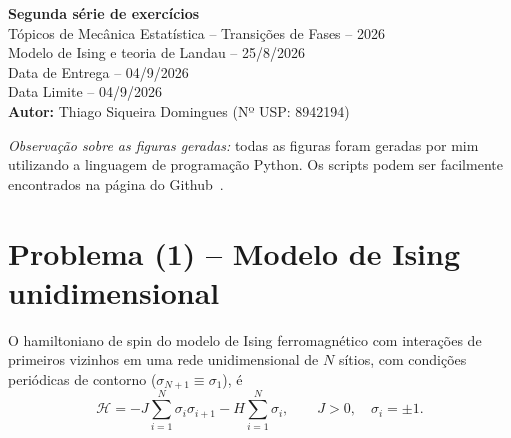 \documentclass[11pt,a4paper]{article}
\begin{document}
%
\begin{center}
    {\Large \textbf{Segunda série de exercícios}}\\[0.6cm]
    {\large Tópicos de Mecânica Estatística -- Transições de Fases -- 2026}\\[0.2cm]
    {\large Modelo de Ising e teoria de Landau -- 25/8/2026}\\[0.4cm]
    {\large Data de Entrega -- 04/9/2026}\\[0.2cm]
    {\large Data Limite -- 04/9/2026}\\[0.2cm]
    {\Large \textbf{Autor:} Thiago Siqueira Domingues (Nº USP: 8942194)}
\end{center}
%
\vspace{0.3cm}

\noindent\textit{Observação sobre as figuras geradas:} todas as figuras foram geradas por mim utilizando a linguagem de programação Python. Os scripts podem ser facilmente encontrados na página do Github~\cite{domingues2026statmech}. 
%
\vspace{0.3cm}
\section*{Problema (1) -- Modelo de Ising unidimensional}
%
O hamiltoniano de spin do modelo de Ising ferromagnético com interações de primeiros vizinhos em uma rede unidimensional de $N$ sítios, com condições periódicas de contorno ($\sigma_{N+1}\equiv\sigma_1$), é
%
\begin{equation}
    \mathcal H = -J\sum_{i=1}^N \sigma_i\sigma_{i+1} - H\sum_{i=1}^N\sigma_i,
    \qquad J>0,\quad \sigma_i=\pm1.
    \label{eq:ising_H}
\end{equation}
%
\end{document}

